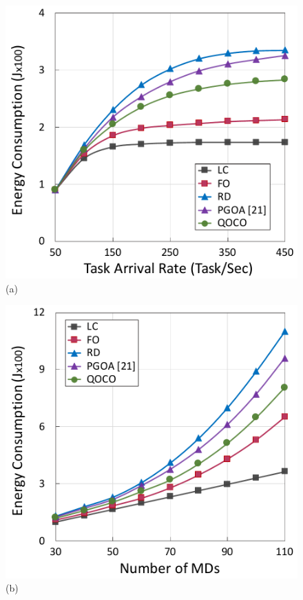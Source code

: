 \begin{frame}
	\begin{figure}
		\begin{minipage}[b]{0.47\linewidth}
			\centering
			\includegraphics[width=\textwidth]{222} 
			\hspace{0.6cm}(a)
		\end{minipage}
		\hspace{-0.2cm}
		\begin{minipage}[b]{0.47\linewidth}
			\centering
			\includegraphics[width=\textwidth]{223}
			\hspace{0.6cm}(b)
		\end{minipage}
		

\end{figure}
\end{frame}
